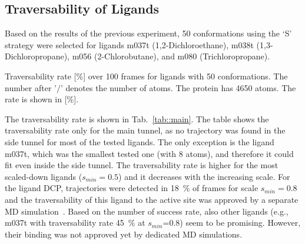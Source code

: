 \documentclass[usletter, 10pt, conference]{ieeeconf} %
\def\smin{s_{min}}
\begin{document}
\subsection{Traversability of Ligands}

Based on the results of the previous experiment, 50 conformations using the `S' strategy were selected for ligands 
m037t (1,2-Dichloroethane), m038t (1,3-Dichloropropane), m056 (2-Chlorobutane), and m080 (Trichloropropane).


\begin{table}[bt]
\centering
\caption{\label{tab::main}
    \small
    Traversability rate [\%] over 100 frames for ligands with 50 conformations. 
    The number after '$/$' denotes the number of atoms.
    The protein has 4650 atoms.
    The rate is shown in [\%].
}
\small
\renewcommand{\tabcolsep}{2pt}
{
\scriptsize
\renewcommand{\arraystretch}{0.7}

}
\end{table}


The traversability rate is shown in Tab.~\ref{tab::main}. 
The table shows the traversability rate only for the main tunnel, as no trajectory was found in the side tunnel for most of the tested ligands.
The only exception is the ligand m037t, which was the smallest tested one (with 8 atoms), and therefore it could fit even inside the side tunnel.
The traversability rate is higher for the most scaled-down ligands ($\smin=0.5$) and it decreases with the increasing scale.
For the ligand DCP, trajectories were detected in 18~\% of frames for scale $\smin=0.8$ and the traversability of this ligand
to the active site was approved by a separate MD simulation~\cite{marques2017catalytic}.
Based on the number of success rate, also other ligands (e.g., m037t with traversability rate 45~\% at $\smin$=0.8) seem to be promising.
However, their binding was not approved yet by dedicated MD simulations.
\end{document}
